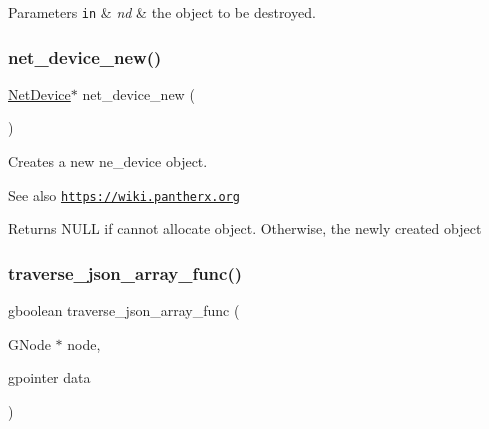 \begin{DoxyParams}[1]{Parameters}
\mbox{\tt in}  & {\em nd} & the object to be destroyed. \\
\hline
\end{DoxyParams}
\mbox{\label{gnode-object_8c_ae666b3f20895e60917e691c81d464235}} 
\subsubsection{\texorpdfstring{net\+\_\+device\+\_\+new()}{net\_device\_new()}}
{\footnotesize\ttfamily \hyperlink{gnode-object_8h_ab9c23d3a2ba4d9157b5ab053f61388dc}{Net\+Device}$\ast$ net\+\_\+device\+\_\+new (\begin{DoxyParamCaption}{ }\end{DoxyParamCaption})}



Creates a new ne\+\_\+device object. 

\begin{DoxySeeAlso}{See also}
\href{https://wiki.pantherx.org}{\tt https\+://wiki.\+pantherx.\+org}
\end{DoxySeeAlso}
\begin{DoxyReturn}{Returns}
N\+U\+LL if cannot allocate object. Otherwise, the newly created object 
\end{DoxyReturn}
\mbox{\label{gnode-object_8c_a0d906716c0b2c59e34bff01153dc23d2}} 
\subsubsection{\texorpdfstring{traverse\+\_\+json\+\_\+array\+\_\+func()}{traverse\_json\_array\_func()}}
{\footnotesize\ttfamily gboolean traverse\+\_\+json\+\_\+array\+\_\+func (\begin{DoxyParamCaption}\item[{G\+Node $\ast$}]{node,  }\item[{gpointer}]{data }\end{DoxyParamCaption})}



